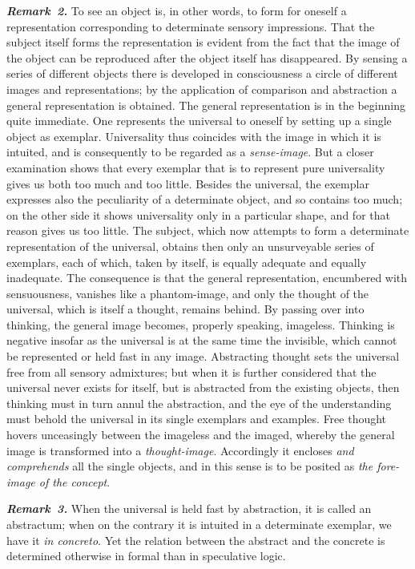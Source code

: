 \documentclass[12pt]{book}
\newcommand{\anm}[1]{\emph{\textbf{Remark~#1.}}}
\begin{document}
\anm{2} To see an object is, in other words, to form for oneself a
representation corresponding to determinate sensory impressions. That the
subject itself forms the representation is evident from the fact that the
image of the object can be reproduced after the object itself has
disappeared. By sensing a series of different objects there is developed in
consciousness a circle of different images and representations; by the
application of comparison and abstraction a general representation is
obtained. The general representation is in the beginning quite immediate.
One represents the universal to oneself by setting up a single object as
exemplar. Universality thus coincides with the image in which it is
intuited, and is consequently to be regarded as a \emph{sense-image}. But a
closer examination shows that every exemplar that is to represent pure
universality gives us both too much and too little. Besides the universal,
the exemplar expresses also the peculiarity of a determinate object, and so
contains too much; on the other side it shows universality only in a
particular shape, and for that reason gives us too little. The subject, which
now attempts to form a determinate representation of the universal, obtains
then only an unsurveyable series of exemplars, each of which, taken by
itself, is equally adequate and equally inadequate. The consequence is that
the general representation, encumbered with sensuousness, vanishes like a
phantom-image, and only the thought of the universal, which is itself a
thought, remains behind. By passing over into thinking, the general image
becomes, properly speaking, imageless. Thinking is negative insofar as the
universal is at the same time the invisible, which cannot be represented or
held fast in any image. Abstracting thought sets the universal free from all
sensory admixtures; but when it is further considered that the universal
never exists for itself, but is abstracted from the existing objects, then
thinking must in turn annul the abstraction, and the eye of the
understanding must behold the universal in its single exemplars and
examples. Free thought hovers unceasingly between the imageless and the
imaged, whereby the general image is transformed into a
\emph{thought-image}. Accordingly it encloses \emph{and comprehends} all the
single objects, and in this sense is to be posited as \emph{the fore-image
of the concept}.

\anm{3} When the universal is held fast by abstraction, it is called an
abstractum; when on the contrary it is intuited in a determinate exemplar,
we have it \textit{in concreto}. Yet the relation between the abstract and
the concrete is determined otherwise in formal than in speculative logic.
\end{document}
